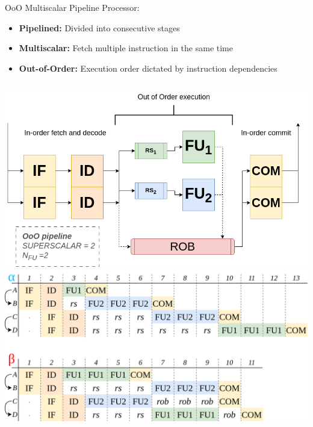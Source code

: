 \documentclass{beamer}
\begin{document}
\begin{frame}{OoO Multiscalar Pipeline}
    Processor:
    \begin{itemize}
        \item \textbf{Pipelined:} Divided into consecutive stages
        \item \textbf{Multiscalar:} Fetch multiple instruction in the same time
        \item \textbf{Out-of-Order:} Execution order dictated by instruction dependencies
    \end{itemize}


    \begin{columns}
        \includegraphics[width=\textwidth]{pic/ooo-pipeline.png}
        \includegraphics[width=\textwidth]{pic/multiscalar_ta.png}
    \end{columns}

\end{frame}
\end{document}
